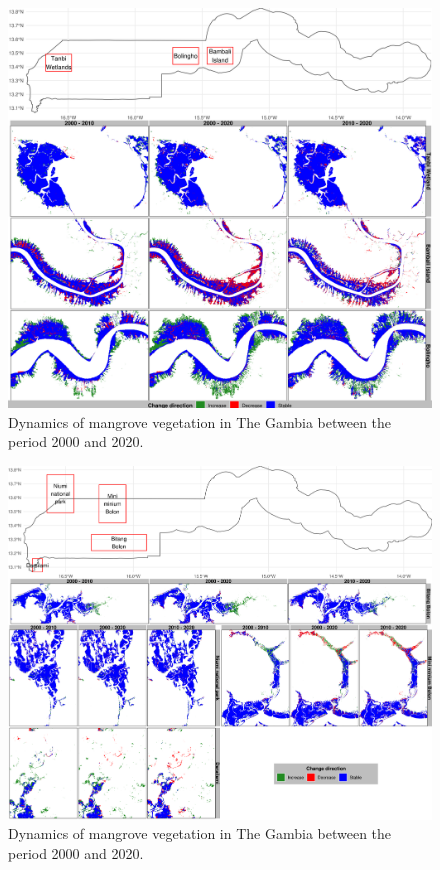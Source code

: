 \documentclass[utf8]{frontiersSCNS}
\begin{document}
\begin{figure}
\includegraphics[width=1\linewidth]{figures/Gambia_change_direction_slices_1} \caption{Dynamics of mangrove vegetation in The Gambia between the period 2000 and 2020.}\label{fig:fig5}
\end{figure}

\begin{figure}
\includegraphics[width=1\linewidth]{figures/Gambia_change_direction_slices_2} \caption{Dynamics of mangrove vegetation in The Gambia between the period 2000 and 2020.}\label{fig:fig6}
\end{figure}
\end{document}
